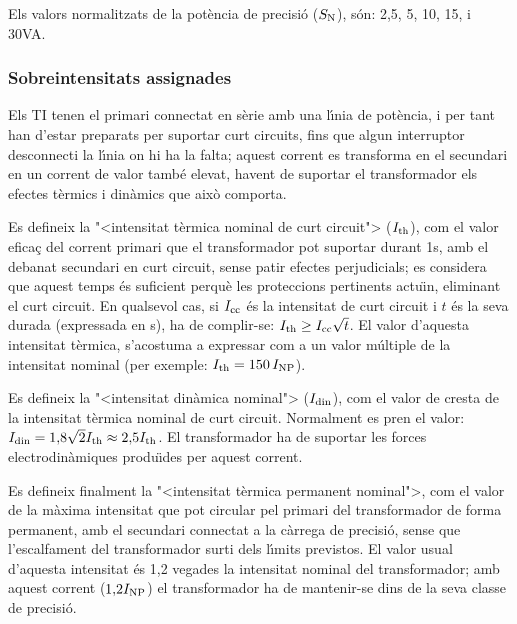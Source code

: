 Els valors normalitzats de la pot\`{e}ncia de precisi\'{o}
 ($S_\mathrm{N}$), s\'{o}n: 2,5, 5, 10, 15, i 30\unit{VA}.

\subsubsection{Sobreintensitats  assignades}

 Els TI
tenen el primari connectat en s\`{e}rie amb una l\'{\i}nia de pot\`{e}ncia, i per tant han
d'estar preparats per suportar curt circuits, fins que algun
interruptor desconnecti la l\'{\i}nia on hi ha la falta; aquest
corrent es transforma en el secundari en un corrent de valor
tamb\'{e} elevat, havent de suportar el transformador els efectes t\`{e}rmics
i din\`{a}mics que aix\`{o} comporta.

Es defineix la {"<}intensitat t\`{e}rmica nominal de curt circuit{">}
($I_\mathrm{th}$), com el valor efica\c{c} del  corrent primari que el
transformador pot suportar durant 1\unit{s}, amb el debanat
secundari en curt circuit, sense patir efectes perjudicials; es
considera que aquest temps \'{e}s suficient perqu\`{e} les proteccions
pertinents actu\"{\i}n, eliminant el curt circuit. En qualsevol cas, si
$I_\mathrm{cc}$ \'{e}s la intensitat de curt circuit i $t$ \'{e}s la seva durada
(expressada en s), ha de complir-se: $I_\mathrm{th}\geq
I_\mathrm{cc}\sqrt{t}$. El valor d'aquesta intensitat t\`{e}rmica,
s'acostuma a expressar com a un valor m\'{u}ltiple de la intensitat
nominal (per exemple: $I_\mathrm{th}=150\,I_\mathrm{NP}$).

Es defineix la {"<}intensitat din\`{a}mica nominal{">} ($I_\mathrm{din}$), com el
valor de cresta de la intensitat t\`{e}rmica nominal de curt circuit.
Normalment es pren el valor: $I_\mathrm{din} =
1{,}8\sqrt{2}I_\mathrm{th}\approx2{,}5I_\mathrm{th}$. El transformador ha de
suportar les forces electrodin\`{a}miques produ\"{\i}des per aquest corrent.

Es defineix finalment la {"<}intensitat t\`{e}rmica permanent nominal{">}, com
el valor de la m\`{a}xima intensitat que pot circular pel primari del
transformador  de forma permanent, amb el secundari connectat a la
c\`{a}rrega de precisi\'{o}, sense que l'escalfament del transformador surti
dels l\'{\i}mits previstos. El valor usual d'aquesta intensitat \'{e}s 1,2
vegades la intensitat nominal del transformador; amb aquest corrent
($1{,}2I_\mathrm{NP}$)  el transformador ha de mantenir-se dins de la
seva classe de precisi\'{o}.

